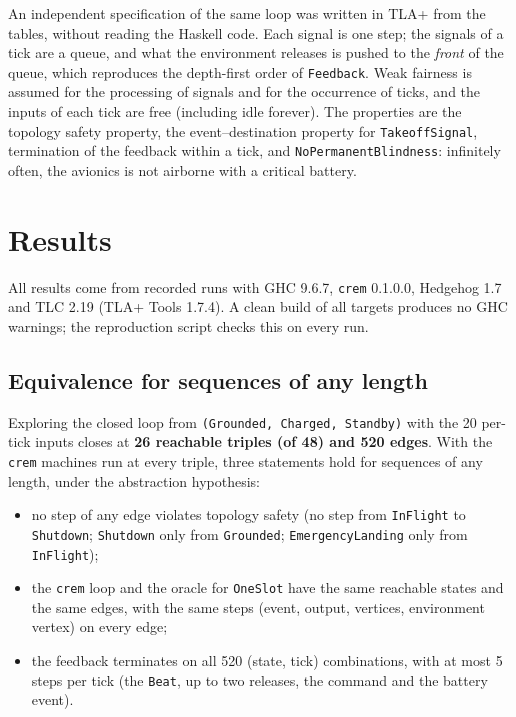 \documentclass[review]{jfp-epi}
\newcommand{\crem}{\texttt{crem}}
\newcommand{\code}[1]{\texttt{#1}}
\begin{document}
An independent specification of the same loop was written in TLA+ \cite{lamport2002specifying} from the tables, without reading the Haskell code. Each signal is one step; the signals of a tick are a queue, and what the environment releases is pushed to the \emph{front} of the queue, which reproduces the depth-first order of \code{Feedback}. Weak fairness is assumed for the processing of signals and for the occurrence of ticks, and the inputs of each tick are free (including idle forever). The properties are the topology safety property, the event--destination property for \code{TakeoffSignal}, termination of the feedback within a tick, and \code{NoPermanentBlindness}: infinitely often, the avionics is not airborne with a critical battery.

\section{Results}
\label{sec:results}

All results come from recorded runs with GHC 9.6.7, \code{crem} 0.1.0.0, Hedgehog 1.7 and TLC 2.19 (TLA+ Tools 1.7.4). A clean build of all targets produces no GHC warnings; the reproduction script checks this on every run.

\subsection{Equivalence for sequences of any length}

Exploring the closed loop from \code{(Grounded, Charged, Standby)} with the 20 per-tick inputs closes at \textbf{26 reachable triples (of 48) and 520 edges}. With the \crem{} machines run at every triple, three statements hold for sequences of any length, under the abstraction hypothesis:
\begin{itemize}
\item no step of any edge violates topology safety (no step from \code{InFlight} to \code{Shutdown}; \code{Shutdown} only from \code{Grounded}; \code{EmergencyLanding} only from \code{InFlight});
\item the \crem{} loop and the oracle for \code{OneSlot} have the same reachable states and the same edges, with the same steps (event, output, vertices, environment vertex) on every edge;
\item the feedback terminates on all 520 (state, tick) combinations, with at most 5 steps per tick (the \code{Beat}, up to two releases, the command and the battery event).
\end{itemize}
\end{document}
